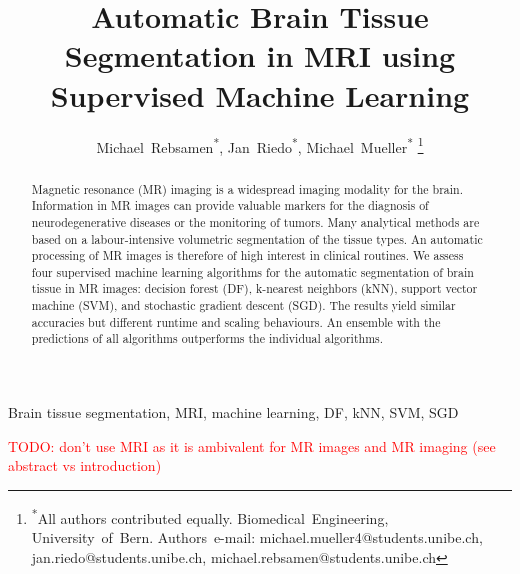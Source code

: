 \documentclass[journal]{IEEEtran}
\newcommand\TODO[1]{\textcolor{red}{TODO: #1}}
\begin{document}
\title{Automatic Brain Tissue Segmentation in MRI using Supervised Machine Learning}

\author{Michael~Rebsamen\textsuperscript{*},
        Jan~Riedo\textsuperscript{*},
        Michael~Mueller\textsuperscript{*}
\thanks{\textsuperscript{*}All authors contributed equally. Biomedical~Engineering, University~of~Bern. Authors~e-mail: michael.mueller4@students.unibe.ch, jan.riedo@students.unibe.ch, michael.rebsamen@students.unibe.ch}}
{}%
\maketitle

\begin{abstract}
Magnetic resonance (MR) imaging is a widespread imaging modality for the brain. Information in MR images can provide valuable markers for the diagnosis of neurodegenerative diseases or the monitoring of tumors. Many analytical methods are based on a labour-intensive volumetric segmentation of the tissue types. An automatic processing of MR images is therefore of high interest in clinical routines. We assess four supervised machine learning algorithms for the automatic segmentation of brain tissue in MR images: decision forest (DF), k-nearest neighbors (kNN), support vector machine (SVM), and stochastic gradient descent (SGD). The results yield similar accuracies but different runtime and scaling behaviours. An ensemble with the predictions of all algorithms outperforms the individual algorithms.
\end{abstract}



\begin{IEEEkeywords}
Brain tissue segmentation, MRI, machine learning, DF, kNN, SVM, SGD
\end{IEEEkeywords}

\TODO{don't use MRI as it is ambivalent for MR images and MR imaging (see abstract vs introduction)}
\end{document}
